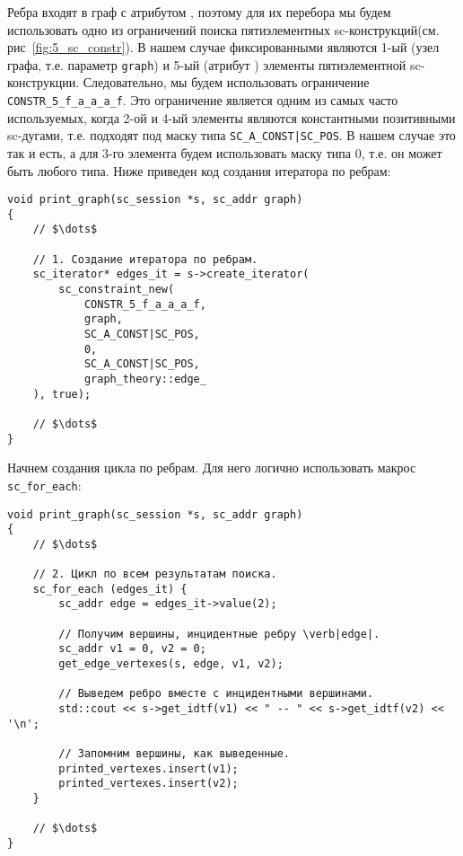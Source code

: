 Ребра входят в граф с атрибутом , поэтому для их
перебора мы будем использовать одно из ограничений поиска
пятиэлементных sc-конструкций(см. рис~\ref{fig:5_sc_constr}). В нашем
случае фиксированными являются 1-ый (узел графа, т.е. параметр
\lstinline|graph|) и 5-ый (атрибут ) элементы
пятиэлементной sc-конструкции. Следовательно, мы будем использовать
ограничение \lstinline|CONSTR_5_f_a_a_a_f|. Это ограничение является
одним из самых часто используемых, когда 2-ой и 4-ый элементы являются
константными позитивными sc-дугами, т.е. подходят под маску типа
\lstinline+SC_A_CONST|SC_POS+. В нашем случае это так и есть, а для
3-го элемента будем использовать маску типа 0, т.е. он может быть
любого типа. Ниже приведен код создания итератора по ребрам:
\begin{lstlisting}[texcl]
void print_graph(sc_session *s, sc_addr graph)
{
    // $\dots$

    // 1. Создание итератора по ребрам.
    sc_iterator* edges_it = s->create_iterator(
        sc_constraint_new(
            CONSTR_5_f_a_a_a_f,
            graph,
            SC_A_CONST|SC_POS,
            0,
            SC_A_CONST|SC_POS,
            graph_theory::edge_
    ), true);

    // $\dots$
}
\end{lstlisting}

Начнем создания цикла по ребрам. Для него логично использовать макрос
\lstinline|sc_for_each|:
\begin{lstlisting}[texcl]
void print_graph(sc_session *s, sc_addr graph)
{
    // $\dots$

    // 2. Цикл по всем результатам поиска.
    sc_for_each (edges_it) {
        sc_addr edge = edges_it->value(2);

        // Получим вершины, инцидентные ребру \verb|edge|.
        sc_addr v1 = 0, v2 = 0;
        get_edge_vertexes(s, edge, v1, v2);

        // Выведем ребро вместе с инцидентными вершинами.
        std::cout << s->get_idtf(v1) << " -- " << s->get_idtf(v2) << '\n';

        // Запомним вершины, как выведенные.
        printed_vertexes.insert(v1);
        printed_vertexes.insert(v2);
    }

    // $\dots$
}
\end{lstlisting}

